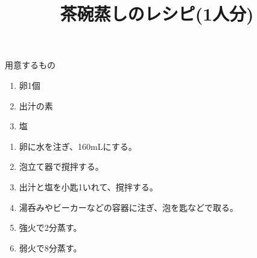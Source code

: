 \documentclass{jarticle}
\begin{document}
	\title{茶碗蒸しのレシピ(1人分)}
	\maketitle

	\begin{itembox}[l]{用意するもの}
		\begin{enumerate}
			\item 卵1個
			\item 出汁の素
			\item 塩
		\end{enumerate}
	\end{itembox}

	\begin{enumerate}
		\item 卵に水を注ぎ、160mLにする。
		\item 泡立て器で撹拌する。
		\item 出汁と塩を小匙1いれて、撹拌する。
		\item 湯呑みやビーカーなどの容器に注ぎ、泡を匙などで取る。
		\item 強火で2分蒸す。
		\item 弱火で8分蒸す。
	\end{enumerate}
\end{document}
